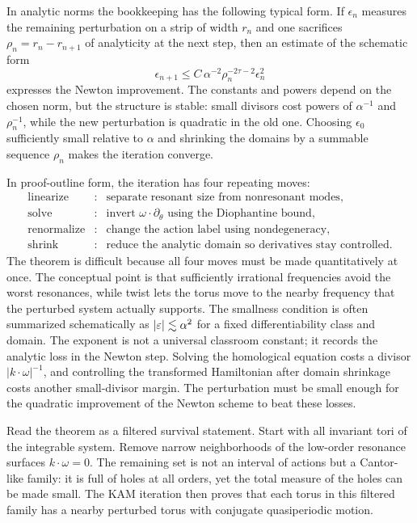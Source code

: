 In analytic norms the bookkeeping has the following typical form. If
\(\epsilon_n\) measures the remaining perturbation on a strip of width \(r_n\)
and one sacrifices \(\rho_n=r_n-r_{n+1}\) of analyticity at the next step, then
an estimate of the schematic form
\[
  \epsilon_{n+1}
  \le
  C\,\alpha^{-2}\rho_n^{-2\tau-2}\epsilon_n^2
\]
expresses the Newton improvement. The constants and powers depend on the chosen
norm, but the structure is stable: small divisors cost powers of
\(\alpha^{-1}\) and \(\rho_n^{-1}\), while the new perturbation is quadratic in
the old one. Choosing \(\epsilon_0\) sufficiently small relative to \(\alpha\)
and shrinking the domains by a summable sequence \(\rho_n\) makes the iteration
converge.

In proof-outline form, the iteration has four repeating moves:
\[
\begin{array}{rcl}
\text{linearize} &:& \text{separate resonant size from nonresonant modes},\\
\text{solve} &:& \text{invert } \omega\cdot\partial_\theta
    \text{ using the Diophantine bound},\\
\text{renormalize} &:& \text{change the action label using nondegeneracy},\\
\text{shrink} &:& \text{reduce the analytic domain so derivatives stay controlled}.
\end{array}
\]
The theorem is difficult because all four moves must be made quantitatively at
once. The conceptual point is that sufficiently irrational frequencies avoid
the worst resonances, while twist lets the torus move to the nearby frequency
that the perturbed system actually supports.
The smallness condition is often summarized schematically as
\(|\varepsilon|\lesssim \alpha^2\) for a fixed differentiability class and domain.
The exponent is not a universal classroom constant; it records the analytic
loss in the Newton step. Solving the homological equation costs a divisor
\(|k\cdot\omega|^{-1}\), and controlling the transformed Hamiltonian after
domain shrinkage costs another small-divisor margin. The perturbation must be
small enough for the quadratic improvement of the Newton scheme to beat these
losses.

Read the theorem as a filtered survival statement. Start with all invariant
tori of the integrable system. Remove narrow neighborhoods of the low-order
resonance surfaces \(k\cdot\omega=0\). The remaining set is
not an interval of actions but a Cantor-like family: it is full of holes at all
orders, yet the total measure of the holes can be made small. The KAM iteration
then proves that each torus in this filtered family has a nearby perturbed
torus with conjugate quasiperiodic motion.

